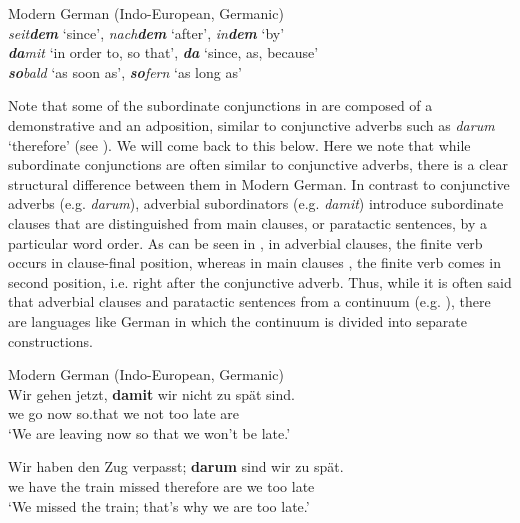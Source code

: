\documentclass[output=paper,colorlinks,citecolor=brown]{langscibook}
\begin{document}
\ea\label{ex:diessel:32}
{Modern German (Indo-European, Germanic)}\\
\ea\label{ex:diessel:32a} \textit{seit}\textbf{\textit{dem}} ‘since’, \textit{nach}\textbf{\textit{dem}} ‘after’, \textit{in}\textbf{\textit{dem}} ‘by’\\
\ex\label{ex:diessel:32b} \textbf{\textit{da}}\textit{mit} ‘in order to, so that’, \textbf{\textit{da}} ‘since, as, because’\\
\ex\label{ex:diessel:32c} \textbf{\textit{so}}\textit{bald} ‘as soon as’, \textbf{\textit{so}}\textit{fern} ‘as long as’\\
\z
\z

Note that some of the subordinate conjunctions in  are composed of a demonstrative and an adposition, similar to conjunctive adverbs such as \textit{darum} ‘therefore’ (see ). We will come back to this below. Here we note that while subordinate conjunctions are often similar to conjunctive adverbs, there is a clear structural difference between them in Modern German. In contrast to conjunctive adverbs (e.g. \textit{darum}), adverbial subordinators (e.g. \textit{damit}) introduce subordinate clauses that are distinguished from main clauses, or paratactic sentences, by a particular word order. As can be seen in , in adverbial clauses, the finite verb occurs in clause-final position, whereas in main clauses , the finite verb comes in second position, i.e. right after the conjunctive adverb. Thus, while it is often said that adverbial clauses and paratactic sentences from a continuum (e.g. \citealt[237]{ThompsonEtAl2007}), there are languages like German in which the continuum is divided into separate constructions.

\ea\label{ex:diessel:33}
{Modern German (Indo-European, Germanic)}\\
\ea\label{ex:diessel:33a}
\gll   Wir   gehen  jetzt,   \textbf{damit}   wir   nicht   zu   spät   sind.\\
       we   go  now  so.that  we  not  too  late  are\\
\glt   ‘We are leaving now so that we won’t be late.’

\ex\label{ex:diessel:33b}
\gll   Wir   haben   den   Zug   verpasst; \textbf{darum}   sind   wir   zu  spät.\\
       we   have  the  train  missed   therefore  are  we  too  late\\
\glt   ‘We missed the train; that’s why we are too late.’
\z
\z
\end{document}
